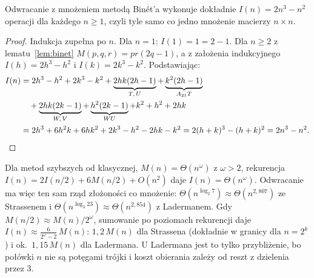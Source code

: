 \begin{tw}\label{tw:inv-binet}
Odwracanie z mnożeniem metodą Binét'a wykonuje dokładnie $I(n)=2n^3-n^2$ operacji dla każdego $n\ge1$, czyli tyle
samo co jedno mnożenie macierzy $n\times n$.
\end{tw}
\begin{proof}
Indukcja zupełna po $n$. Dla $n=1$: $I(1)=1=2-1$. Dla $n\ge2$ z lematu~\ref{lem:binet} $M(p,q,r)=pr(2q-1)$,
a z założenia indukcyjnego $I(h)=2h^3-h^2$ i $I(k)=2k^3-k^2$. Podstawiając:
\[
\begin{aligned}
I(n)&=2h^3-h^2+2k^3-k^2+\underbrace{2hk(2h-1)}_{T,\,U}+\underbrace{k^2(2h-1)}_{A_{21}T}\\
    &\quad+\underbrace{2hk(2k-1)}_{W,\,V}+\underbrace{h^2(2k-1)}_{WU}+k^2+h^2+2hk\\
    &=2h^3+6h^2k+6hk^2+2k^3-h^2-2hk-k^2=2(h+k)^3-(h+k)^2=2n^3-n^2.\qedhere
\end{aligned}
\]
\end{proof}

Dla metod szybszych od klasycznej, $M(n)=\Theta(n^\omega)$ z $\omega>2$, rekurencja
$I(n)=2I(n/2)+6M(n/2)+O(n^2)$ daje $I(n)=\Theta(n^\omega)$. Odwracanie ma więc ten sam rząd złożoności co
mnożenie: $\Theta(n^{\log_2 7})\approx\Theta(n^{2{,}807})$ ze Strassenem i $\Theta(n^{\log_3 23})\approx\Theta(n^{2{,}854})$
z Ladermanem. Gdy $M(n/2)\approx M(n)/2^\omega$, sumowanie po poziomach rekurencji daje
$I(n)\approx\frac{6}{2^\omega-2}\,M(n)$: $1{,}2\,M(n)$ dla Strassena (dokładnie w granicy dla $n=2^k$) i ok.\
$1{,}15\,M(n)$ dla Ladermana. U Ladermana jest to tylko przybliżenie, bo połówki $n$ nie są potęgami trójki i koszt
obierania zależy od reszt z dzielenia przez 3.

